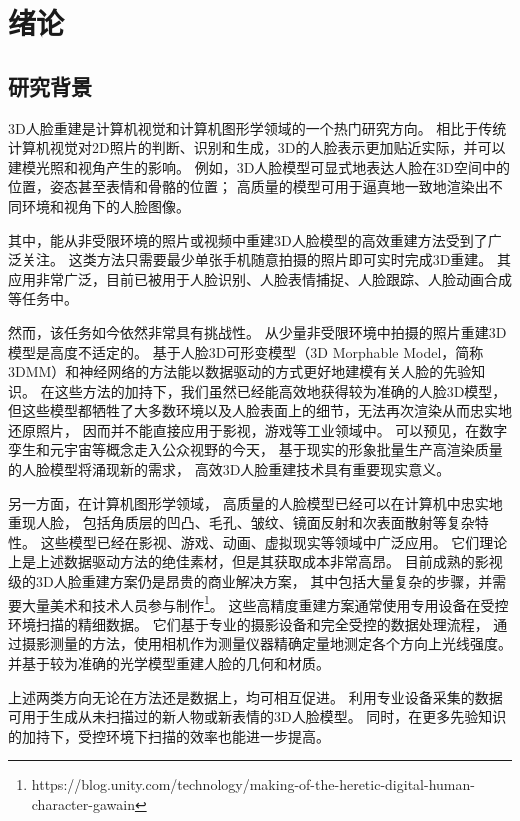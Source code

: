 \chapter{绪论}
\label{chap:intro}

\section{研究背景}

3D人脸重建是计算机视觉和计算机图形学领域的一个热门研究方向。
相比于传统计算机视觉对2D照片的判断、识别和生成，3D的人脸表示更加贴近实际，并可以建模光照和视角产生的影响。
例如，3D人脸模型可显式地表达人脸在3D空间中的位置，姿态甚至表情和骨骼的位置；
高质量的模型可用于逼真地一致地渲染出不同环境和视角下的人脸图像。

其中，能从非受限环境的照片或视频中重建3D人脸模型的高效重建方法受到了广泛关注。
这类方法只需要最少单张手机随意拍摄的照片即可实时完成3D重建。
其应用非常广泛，目前已被用于人脸识别\citep{BlanzV03,1022631413.nh}、人脸表情捕捉\cite{Mo2022TowardsAF}、人脸跟踪\citep{Pham2016RobustRP}、人脸动画合成\citep{Cao20133DSR}等任务中。

然而，该任务如今依然非常具有挑战性。
从少量非受限环境中拍摄的照片重建3D模型是高度不适定的。
基于人脸3D可形变模型（3D Morphable Model，简称3DMM）和神经网络的方法能以数据驱动的方式更好地建模有关人脸的先验知识。
在这些方法的加持下，我们虽然已经能高效地获得较为准确的人脸3D模型，
但这些模型都牺牲了大多数环境以及人脸表面上的细节，无法再次渲染从而忠实地还原照片，
因而并不能直接应用于影视，游戏等工业领域中。
可以预见，在数字孪生和元宇宙等概念走入公众视野的今天，
基于现实的形象批量生产高渲染质量的人脸模型将涌现新的需求，
高效3D人脸重建技术具有重要现实意义。

另一方面，在计算机图形学领域，
高质量的人脸模型已经可以在计算机中忠实地重现人脸，
包括角质层的凹凸、毛孔、皱纹、镜面反射和次表面散射等复杂特性。
这些模型已经在影视、游戏、动画、虚拟现实等领域中广泛应用。
它们理论上是上述数据驱动方法的绝佳素材，但是其获取成本非常高昂。
目前成熟的影视级的3D人脸重建方案仍是昂贵的商业解决方案，
其中包括大量复杂的步骤，并需要大量美术和技术人员参与制作\footnote{https://blog.unity.com/technology/making-of-the-heretic-digital-human-character-gawain}。
这些高精度重建方案通常使用专用设备在受控环境扫描的精细数据。
它们基于专业的摄影设备和完全受控的数据处理流程，
通过摄影测量的方法，使用相机作为测量仪器精确定量地测定各个方向上光线强度。
并基于较为准确的光学模型重建人脸的几何和材质。

上述两类方向无论在方法还是数据上，均可相互促进。
利用专业设备采集的数据可用于生成从未扫描过的新人物或新表情的3D人脸模型。
同时，在更多先验知识的加持下，受控环境下扫描的效率也能进一步提高。

